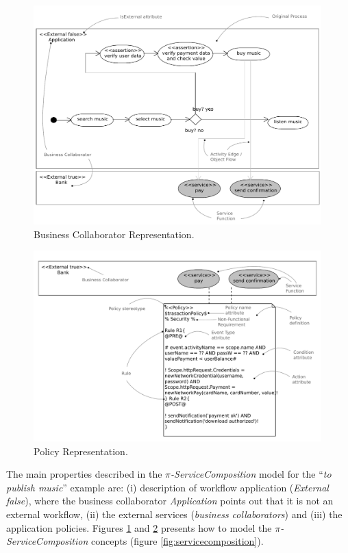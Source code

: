 \begin{figure}[ht!] 
\centering
\includegraphics[width=0.99\textwidth]{chapters/methodology/figs/serviceComposition_detail}
\caption{Business Collaborator Representation.}
\label{fig:businesscollaborator_detail}
\end{figure}
  
\begin{figure}[ht!] 
\centering
\includegraphics[width=0.99\textwidth]{chapters/methodology/figs/policy_detail}
\caption{Policy Representation.}
\label{fig:policy_detail}
\end{figure} 

The main properties described in the  \textit{$\pi$-ServiceComposition} model
for the ``\textit{to publish music}'' example are: (i) description of workflow
application (\textit{External false}), where the business collaborator \textit{Application} points out that it is not an
external workflow, (ii) the external services (\textit{business collaborators})
and (iii) the application policies. Figures
\ref{fig:businesscollaborator_detail} and \ref{fig:policy_detail} presents how
to model the \textit{$\pi$-ServiceComposition} concepts (figure
\ref{fig:servicecomposition}).


